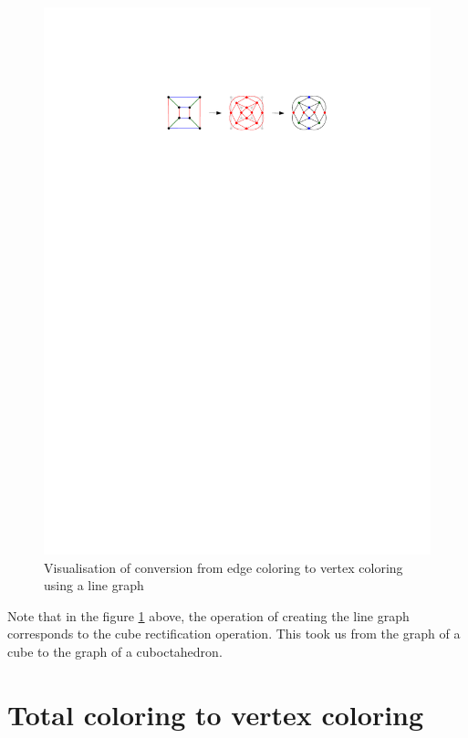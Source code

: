 \begin{figure}[H]
    \centering
    \includegraphics[width=1\textwidth]{../Resources/Figs/cubical_line_graph.pdf}
    \caption{Visualisation of conversion from edge coloring to vertex coloring using a line graph}
    \label{fig:cubical_line_graph}
\end{figure}

Note that in the figure \ref{fig:cubical_line_graph} above, the operation of creating the line graph corresponds to the cube rectification operation. This took us from the graph of a cube to the graph of a cuboctahedron.

\vspace{5pt}

\section{Total coloring to vertex coloring}

